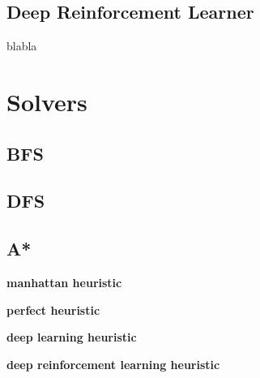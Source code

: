 \subsection{Deep Reinforcement Learner}
\label{DRLSS}

blabla


\section{Solvers}

\subsection{BFS}
\label{BFSSS}


\subsection{DFS}
\label{DFSSS}



\subsection{A*}
\label{ASSS}

\textbf{manhattan heuristic}

\textbf{perfect heuristic}

\textbf{deep learning heuristic}

\textbf{deep reinforcement learning heuristic}


